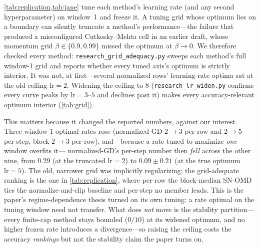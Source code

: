 \documentclass{article}
\begin{document}
\cref{tab:replication,tab:jane} tune each method's learning rate (and any second
hyperparameter) on window~1 and freeze it. A tuning grid whose optimum lies on a boundary can
silently truncate a method's performance---the failure that produced a misconfigured
Cutkosky--Mehta cell in an earlier draft, whose momentum grid $\beta\in\{0.9,0.99\}$ missed the
optimum at $\beta\!\to\!0$. We therefore checked every method:
\texttt{research\_grid\_adequacy.py} sweeps each method's full window-1 grid and reports whether
every tuned axis's optimum is strictly interior. It was not, at first---several normalized rows'
learning-rate optima sat at the old ceiling $\mathrm{lr}{=}2$. Widening the ceiling to $8$
(\texttt{research\_lr\_widen.py} confirms every curve peaks by $\mathrm{lr}{=}3$--$5$ and
declines past it) makes every accuracy-relevant optimum interior (\cref{tab:grid}).

This matters because it changed the reported numbers, against our interest. Three
window-1-optimal rates rose (normalized-GD $2\!\to\!3$ per-row and $2\!\to\!5$ per-step, block
$2\!\to\!3$ per-row), and---because a rate tuned to maximize \emph{one} window overfits it---%
normalized-GD's per-step number then \emph{fell} across the other nine, from $0.29$ (at the
truncated $\mathrm{lr}{=}2$) to $0.09\!\pm\!0.21$ (at the true optimum $\mathrm{lr}{=}5$). The
old, narrower grid was implicitly regularizing; the grid-adequate ranking is the one in
\cref{tab:replication}, where per-row the block-median SN-OMD ties the normalize-and-clip
baseline and per-step no member leads. This is the paper's regime-dependence thesis turned on
its own tuning: a rate optimal on the tuning window need not transfer. What does \emph{not}
move is the stability partition---every finite-cap method stays bounded ($0/10$) at its widened
optimum, and no higher frozen rate introduces a divergence---so raising the ceiling costs the
accuracy \emph{rankings} but not the stability claim the paper turns on.
\end{document}
